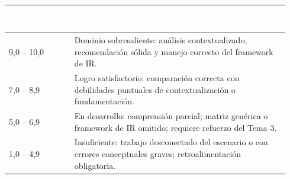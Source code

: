 \documentclass[11pt]{article}
\newcommand{\thdr}[1]{\cellcolor{utegreen}\textcolor{white}{\textbf{#1}}}
\begin{document}
\noindent\begin{tabular}{|C{0.22\linewidth}|L{0.72\linewidth}|}
\hline
\thdr{Nota final (/10)} & \thdr{Interpretación}\\
\hline
{}9,0 -- 10,0 & Dominio sobresaliente: análisis contextualizado, recomendación sólida y manejo correcto del framework de IR.\\
\hline
{}7,0 -- 8,9 & Logro satisfactorio: comparación correcta con debilidades puntuales de contextualización o fundamentación.\\
\hline
{}5,0 -- 6,9 & En desarrollo: comprensión parcial; matriz genérica o framework de IR omitido; requiere refuerzo del Tema 3.\\
\hline
{}1,0 -- 4,9 & Insuficiente: trabajo desconectado del escenario o con errores conceptuales graves; retroalimentación obligatoria.\\
\hline
\end{tabular}

\vspace{10pt}
\end{document}
